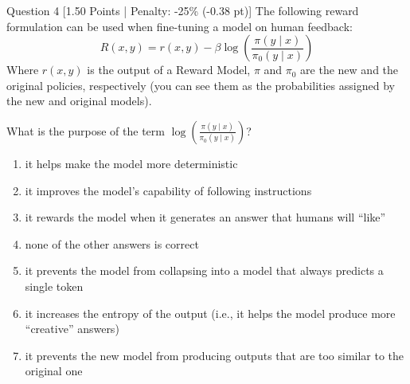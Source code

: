 \documentclass[11pt,a4paper]{article}
\begin{document}
\vspace{0.3cm}

\begin{questionbox}{Question 4 \hfill [1.50 Points | Penalty: -25\% (-0.38 pt)]}
The following reward formulation can be used when fine-tuning a model on human feedback:
\begin{equation*}
R(x, y) = r(x, y) - \beta \log \left( \frac{\pi(y \mid x)}{\pi_0(y \mid x)} \right)
\end{equation*}
Where $r(x, y)$ is the output of a Reward Model, $\pi$ and $\pi_0$ are the new and the original policies, respectively (you can see them as the probabilities assigned by the new and original models).

\noindent What is the purpose of the term $\log \left( \frac{\pi(y \mid x)}{\pi_0(y \mid x)} \right)$?

\begin{enumerate}[label=\alph*.,itemsep=2pt]
    \item it helps make the model more deterministic
    \item it improves the model's capability of following instructions
    \item it rewards the model when it generates an answer that humans will ``like''
    \item none of the other answers is correct
    \item it prevents the model from collapsing into a model that always predicts a single token
    \item it increases the entropy of the output (i.e., it helps the model produce more ``creative'' answers)
    \item it prevents the new model from producing outputs that are too similar to the original one
\end{enumerate}
\end{questionbox}

\vspace{0.3cm}
\end{document}
